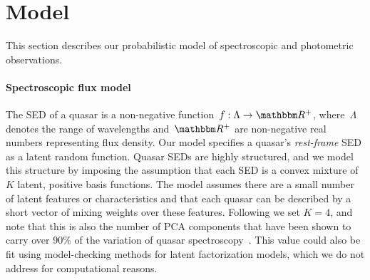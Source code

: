 \documentclass{article} %
\begin{document}
\section{Model}
\label{sec:model}
This section describes our probabilistic model of spectroscopic and photometric observations.  

\paragraph{Spectroscopic flux model}
The SED of a quasar is a non-negative function~${f : \Lambda \rightarrow \R^+}$, where~$\Lambda$ denotes the range of wavelengths and~$\R^+$ are non-negative real numbers representing flux density.
Our model specifies a quasar's \emph{rest-frame} SED as a latent random function. 
Quasar SEDs are highly structured, and we model this structure by imposing the assumption that each SED is a convex mixture of~$K$ latent, positive basis functions. 
The model assumes there are a small number of latent features or characteristics and that each quasar can be described by a short vector of mixing weights over these features.  
Following \cite{budavari2001photometric} we set ${K = 4}$, and note that this is also the number of PCA components that have been shown to carry over 90\% of the variation of quasar spectroscopy~\cite{suzuki2006quasar}.  
This value could also be fit using model-checking methods for latent factorization models, which we do not address for computational reasons.
\end{document}
